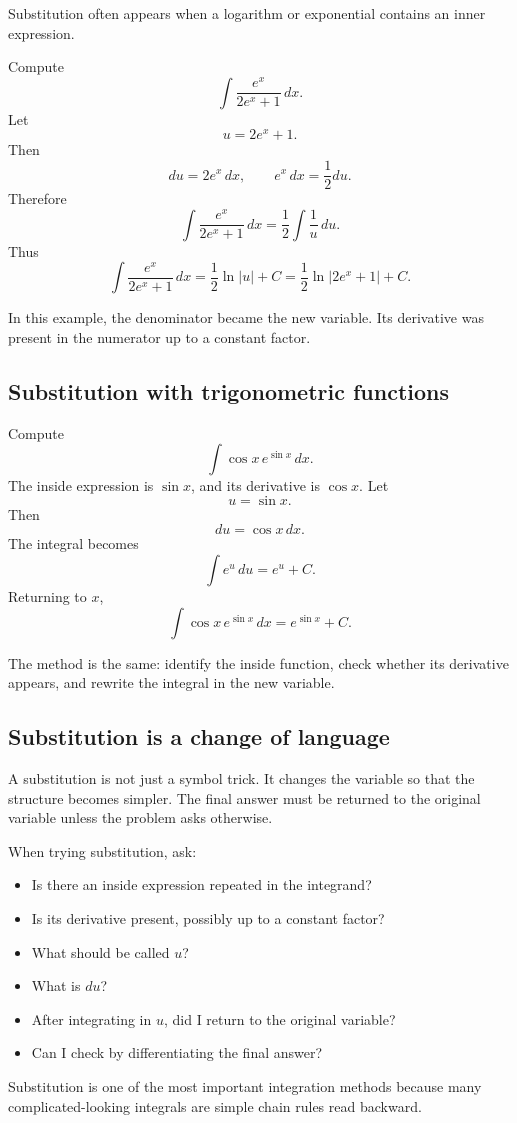 Substitution often appears when a logarithm or exponential contains an inner expression.

\begin{examplebox}
Compute
\[
\int \frac{e^x}{2e^x+1}\,dx.
\]
Let
\[
u=2e^x+1.
\]
Then
\[
du=2e^x\,dx,
\qquad
e^x\,dx=\frac12du.
\]
Therefore
\[
\int \frac{e^x}{2e^x+1}\,dx
=\frac12\int \frac1u\,du.
\]
Thus
\[
\int \frac{e^x}{2e^x+1}\,dx
=\frac12\ln|u|+C
=\frac12\ln|2e^x+1|+C.
\]
\end{examplebox}

In this example, the denominator became the new variable. Its derivative was present in the numerator up to a constant factor.

\subsection*{Substitution with trigonometric functions}

\begin{examplebox}
Compute
\[
\int \cos x\,e^{\sin x}\,dx.
\]
The inside expression is \(\sin x\), and its derivative is \(\cos x\). Let
\[
u=\sin x.
\]
Then
\[
du=\cos x\,dx.
\]
The integral becomes
\[
\int e^u\,du=e^u+C.
\]
Returning to \(x\),
\[
\int \cos x\,e^{\sin x}\,dx=e^{\sin x}+C.
\]
\end{examplebox}

The method is the same: identify the inside function, check whether its derivative appears, and rewrite the integral in the new variable.

\subsection*{Substitution is a change of language}

A substitution is not just a symbol trick. It changes the variable so that the structure becomes simpler. The final answer must be returned to the original variable unless the problem asks otherwise.

\begin{summarybox}
When trying substitution, ask:
\begin{itemize}
\item Is there an inside expression repeated in the integrand?
\item Is its derivative present, possibly up to a constant factor?
\item What should be called \(u\)?
\item What is \(du\)?
\item After integrating in \(u\), did I return to the original variable?
\item Can I check by differentiating the final answer?
\end{itemize}
\end{summarybox}

Substitution is one of the most important integration methods because many complicated-looking integrals are simple chain rules read backward.